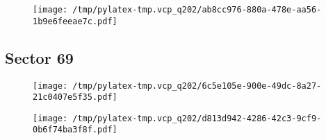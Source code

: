 \documentclass{report}%
\begin{document}
%


\begin{figure}[H]%
\begin{center}%
\centering%
\texttt{[image: /tmp/pylatex-tmp.vcp\_q202/ab8cc976-880a-478e-aa56-1b9e6feeae7c.pdf]}%
\end{center}%
\end{figure}

%
\subsection{Sector 69}%
\label{subsec:42593364469}%


\begin{figure}[H]%
\begin{center}%
\centering%
\texttt{[image: /tmp/pylatex-tmp.vcp\_q202/6c5e105e-900e-49dc-8a27-21c0407e5f35.pdf]}%
\end{center}%
\end{figure}

%


\begin{figure}[H]%
\begin{center}%
\centering%
\texttt{[image: /tmp/pylatex-tmp.vcp\_q202/d813d942-4286-42c3-9cf9-0b6f74ba3f8f.pdf]}%
\end{center}%
\end{figure}

%
\end{document}
